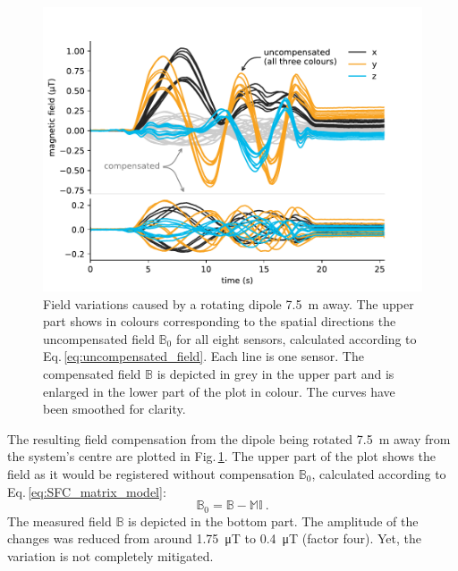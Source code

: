 
\begin{figure}
  \centering
  \includegraphics[width=\linewidth]{gfx/prototype/compensated_7_5m_double.pdf}
  \caption{Field variations caused by a rotating dipole \SI{7.5}{\meter} away.
  The upper part shows in colours corresponding to the spatial directions the uncompensated field $\mathbb{B}_0$ for all eight sensors, calculated according to Eq.\,\ref{eq:uncompensated_field}. Each line is one sensor. The compensated field $\mathbb{B}$ is depicted in grey in the upper part and is enlarged in the lower part of the plot in colour. The curves have been smoothed for clarity.}\label{fig:prototype_compensation_time}
\end{figure}

The resulting field compensation from the dipole being rotated \SI{7.5}{\meter} away from the system's centre are plotted in Fig.\,\ref{fig:prototype_compensation_time}. The upper part of the plot shows the field as it would be registered without compensation $\mathbb{B}_0$, calculated according to Eq.\,\ref{eq:SFC_matrix_model}:
\begin{equation}
  \label{eq:uncompensated_field}
  \mathbb{B}_0 = \mathbb{B} - \mathbb{M} \mathbb{I} \ .
\end{equation}
The measured field $\mathbb{B}$ is depicted in the bottom part.
The amplitude of the changes was reduced from around \SI{1.75}{\micro\tesla} to \SI{0.4}{\micro\tesla} (factor four).
Yet, the variation is not completely mitigated.


